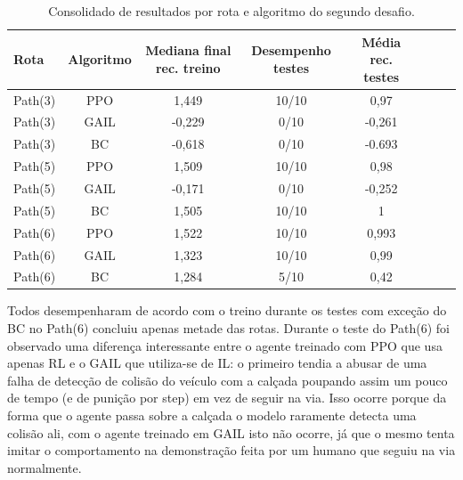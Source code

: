 \begin{table}[htpb]
    \centering
    \caption{Consolidado de resultados por rota e algoritmo do segundo desafio.}
    \label{resultado-tabela-desafio-2}
    \begin{tabular}{|l|c|c|c|c|c|c|r|}
         \hline
         \small{Rota} & \small{Algoritmo}   & \small{Mediana final rec. treino}  & \small{Desempenho testes}    & \small{Média rec. testes} \\ \hline
            Path(3)   &      PPO            &   1,449                            &    10/10                     &      0,97                 \\ \hline
            Path(3)   &      GAIL           &   -0,229                           &    0/10                      &      -0,261               \\ \hline
            Path(3)   &      BC             &   -0,618                           &    0/10                      &      -0.693               \\ \hline
            Path(5)   &      PPO            &   1,509                            &    10/10                     &      0,98                 \\ \hline
            Path(5)   &      GAIL           &   -0,171                           &    0/10                      &      -0,252               \\ \hline
            Path(5)   &      BC             &   1,505                            &    10/10                     &      1                    \\ \hline
            Path(6)   &      PPO            &   1,522                            &    10/10                     &      0,993                \\ \hline
            Path(6)   &      GAIL           &   1,323                            &    10/10                     &      0,99                 \\ \hline
            Path(6)   &      BC             &   1,284                            &    5/10                      &      0,42                 \\ \hline
    \end{tabular}
\end{table}

Todos desempenharam de acordo com o treino durante os testes com exceção do BC no Path(6) concluiu apenas metade das rotas. Durante o teste do Path(6) foi observado uma diferença interessante entre o agente treinado com PPO que usa apenas RL e o GAIL que utiliza-se de IL: o primeiro tendia a abusar de uma falha de detecção de colisão do veículo com a calçada poupando assim um pouco de tempo (e de punição por step) em vez de seguir na via. Isso ocorre porque da forma que o agente passa sobre a calçada o modelo raramente detecta uma colisão ali, com o agente treinado em GAIL isto não ocorre, já que o mesmo tenta imitar o comportamento na demonstração feita por um humano que seguiu na via normalmente.

